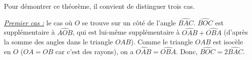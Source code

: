 \begin{preuve}
Pour démontrer ce théorème, il convient de distinguer trois cas.

\underline{\textit{Premier cas :}} le cas où $O$ se trouve sur un côté de l'angle $\widehat{BAC}$.
\newline
$\widehat{BOC}$ est supplémentaire à $\widehat{AOB}$, qui est lui-même supplémentaire à $\widehat{OAB}+\widehat{OBA}$ (d'après la somme des angles dans le triangle $OAB$). Comme le triangle $OAB$ est isocèle en $O$ ($OA=OB$ car c'est des rayons), on a $\widehat{OAB}=\widehat{OBA}$. Donc, $\widehat{BOC}=2\widehat{BAC}$.


\end{preuve}

